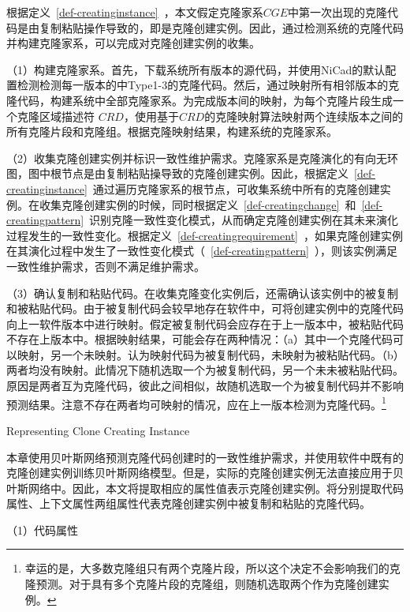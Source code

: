 根据定义~\ref{def-creatinginstance}~，本文假定克隆家系$CGE$中第一次出现的克隆代码是由复制粘贴操作导致的，即是克隆创建实例。因此，通过检测系统的克隆代码并构建克隆家系，可以完成对克隆创建实例的收集。

（1）构建克隆家系。首先，下载系统所有版本的源代码，并使用NiCad的默认配置检测检测每一版本的中Type1-3的克隆代码。然后，通过映射所有相邻版本的克隆代码，构建系统中全部克隆家系。为完成版本间的映射，为每个克隆片段生成一个克隆区域描述符 $CRD$\cite{duala2010clone}，使用基于$CRD$的克隆映射算法映射两个连续版本之间的所有克隆片段和克隆组\cite{ci2013new}\cite{ci2013newD}。根据克隆映射结果，构建系统的克隆家系。

（2）收集克隆创建实例并标识一致性维护需求。克隆家系是克隆演化的有向无环图，图中根节点是由复制粘贴操导致的克隆创建实例。因此，根据定义~\ref{def-creatinginstance}~通过遍历克隆家系的根节点，可收集系统中所有的克隆创建实例。在收集克隆创建实例的时候，同时根据定义~\ref{def-creatingchange}~和~\ref{def-creatingpattern}~识别克隆一致性变化模式，从而确定克隆创建实例在其未来演化过程发生的一致性变化。根据定义~\ref{def-creatingrequirement}~，如果克隆创建实例在其演化过程中发生了一致性变化模式（~\ref{def-creatingpattern}~），则该实例满足一致性维护需求，否则不满足维护需求。

（3）确认复制和粘贴代码。在收集克隆变化实例后，还需确认该实例中的被复制和被粘贴代码。由于被复制代码会较早地存在软件中，可将创建实例中的克隆代码向上一软件版本中进行映射。假定被复制代码会应存在于上一版本中，被粘贴代码不存在上版本中。根据映射结果，可能会存在两种情况：（a）其中一个克隆代码可以映射，另一个未映射。认为映射代码为被复制代码，未映射为被粘贴代码。（b）两者均没有映射。此情况下随机选取一个为被复制代码，另一个未未被粘贴代码。原因是两者互为克隆代码，彼此之间相似，故随机选取一个为被复制代码并不影响预测结果。注意不存在两者均可映射的情况，应在上一版本检测为克隆代码。\footnote{幸运的是，大多数克隆组只有两个克隆片段，所以这个决定不会影响我们的克隆预测。对于具有多个克隆片段的克隆组，则随机选取两个作为克隆创建实例。}

{Representing Clone Creating Instance}
\label{lab-creatingattribute}

本章使用贝叶斯网络预测克隆代码创建时的一致性维护需求，并使用软件中既有的克隆创建实例训练贝叶斯网络模型。但是，实际的克隆创建实例无法直接应用于贝叶斯网络中。因此，本文将提取相应的属性值表示克隆创建实例。将分别提取代码属性、上下文属性两组属性代表克隆创建实例中被复制和粘贴的克隆代码。


（1）代码属性

